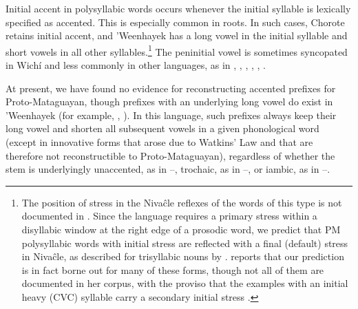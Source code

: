 Initial accent in polysyllabic words occurs whenever the initial syllable is lexically specified as accented. This is especially common in roots. In such cases, Chorote retains initial accent, and 'Weenhayek has a long vowel in the initial syllable and short vowels in all other syllables.\footnote{The position of stress in the Nivaĉle reflexes of the words of this type is not documented in \citet{AnG15}. Since the language requires a primary stress within a disyllabic window at the right edge of a prosodic word, we predict that PM polysyllabic words with initial stress are reflected with a final (default) stress in Nivaĉle, as described for trisyllabic nouns by \citet[165]{AnG15}.  reports that our prediction is in fact borne out for many of these forms, though not all of them are documented in her corpus, with the proviso that the examples with an initial heavy (CVC) syllable carry a secondary initial stress \citep[34, 55]{AnG19}.} The peninitial vowel is sometimes syncopated in Wichí and less commonly in other languages, as in , , , , , .

\begin{exe}
    \ex \redquebracho \label{sync-quebracho}
    \ex \chaniarf
    \ex \chaniart
    \ex \iscayante
    \ex \nightmonkey
    \ex \bearded
    \ex \teach
    \ex \tsofatajf \label{sync-tsoftaj}
    \ex \tsofatajt
    \ex \guayacan
    \ex \blackalgarrobof
    \ex \blackalgarrobot
    \ex \cardinal
    \ex \rhea \label{sync-rhea}
    \ex \jelayuk
    \ex \alligator
    \ex \peccary
    \ex \chaguara
    \ex \wildbean \label{sync-wildbean}
    \ex \waspaniti
    \ex \teach
    \ex \hiccup \label{sync-hiccup}
    \ex \heartcwits \label{sync-heartcwits}
\end{exe}

At present, we have found no evidence for reconstructing accented prefixes for Proto-Mataguayan, though prefixes with an underlying long vowel do exist in 'Weenhayek (for example, , ). In this language, such prefixes always keep their long vowel and shorten all subsequent vowels in a given phonological word (except in innovative forms that arose due to Watkins' Law and that are therefore not reconstructible to Proto-Mataguayan), regardless of whether the stem is underlyingly unaccented, as in --, trochaic, as in --, or iambic, as in --.

